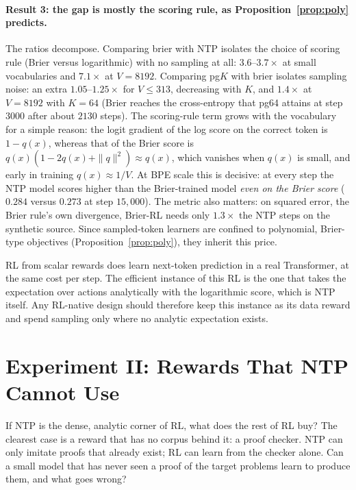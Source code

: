 \documentclass[11pt]{article}
\theoremstyle{definition}
\begin{document}
\paragraph{Result 3: the gap is mostly the scoring rule, as Proposition~\ref{prop:poly} predicts.} The ratios decompose. Comparing \textsf{brier} with NTP isolates the choice of scoring rule (Brier versus logarithmic) with no sampling at all: $3.6$--$3.7\times$ at small vocabularies and $7.1\times$ at $V=8192$. Comparing \textsf{pg}$K$ with \textsf{brier} isolates sampling noise: an extra $1.05$--$1.25\times$ for $V\le313$, decreasing with $K$, and $1.4\times$ at $V=8192$ with $K=64$ (Brier reaches the cross-entropy that \textsf{pg64} attains at step $3000$ after about $2130$ steps). The scoring-rule term grows with the vocabulary for a simple reason: the logit gradient of the log score on the correct token is $1-q(x)$, whereas that of the Brier score is $q(x)(1-2q(x)+\|q\|^2)\approx q(x)$, which vanishes when $q(x)$ is small, and early in training $q(x)\approx1/V$. At BPE scale this is decisive: at every step the NTP model scores higher than the Brier-trained model \emph{even on the Brier score} ($0.284$ versus $0.273$ at step $15{,}000$). The metric also matters: on squared error, the Brier rule's own divergence, Brier-RL needs only $1.3\times$ the NTP steps on the synthetic source. Since sampled-token learners are confined to polynomial, Brier-type objectives (Proposition~\ref{prop:poly}), they inherit this price.

\begin{thesis}
RL from scalar rewards does learn next-token prediction in a real Transformer, at the same cost per step. The efficient instance of this RL is the one that takes the expectation over actions analytically with the logarithmic score, which is NTP itself. Any RL-native design should therefore keep this instance as its data reward and spend sampling only where no analytic expectation exists.
\end{thesis}

\section{Experiment II: Rewards That NTP Cannot Use}\label{sec:exp2}

\begin{plain}
If NTP is the dense, analytic corner of RL, what does the rest of RL buy? The clearest case is a reward that has no corpus behind it: a proof checker. NTP can only imitate proofs that already exist; RL can learn from the checker alone. Can a small model that has never seen a proof of the target problems learn to produce them, and what goes wrong?
\end{plain}
\end{document}

